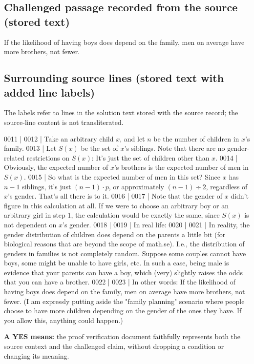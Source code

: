 \documentclass[11pt]{article}
\begin{document}
\subsection*{Challenged passage recorded from the source (stored text)}
\begin{Vsrc}
If the likelihood of having boys does depend on the family, men on average have more brothers, not fewer.
\end{Vsrc}
\subsection*{Surrounding source lines (stored text with added line labels)}
The labels refer to lines in the solution text stored with the source record; the source-line content is not transliterated.
\begin{Vsrc}
0011 | 
0012 | Take an arbitrary child $x$, and let $n$ be the number of children in $x$'s family. 
0013 | Let $S(x)$ be the set of $x$'s siblings. Note that there are no gender-related restrictions on $S(x)$: It's just the set of children other than $x$.
0014 | Obviously, the expected number of $x$'s brothers is the expected number of men in $S(x)$. 
0015 | So what is the expected number of men in this set? Since $x$ has $n-1$ siblings, it's just $(n-1)\cdot p$, or approximately $(n-1)\div 2$, regardless of $x$'s gender. That's all there is to it.
0016 | 
0017 | Note that the gender of $x$ didn't figure in this calculation at all. If we were to choose an arbitrary boy or an arbitrary girl in step 1, the calculation would be exactly the same, since $S(x)$ is not dependent on $x$'s gender.
0018 | 
0019 | In real life: 
0020 | 
0021 | In reality, the gender distribution of children does depend on the parents a little bit (for biological reasons that are beyond the scope of math.se). I.e., the distribution of genders in families is not completely random. Suppose some couples cannot have boys, some might be unable to have girls, etc. In such a case, being male is evidence that your parents can have a boy, which (very) slightly raises the odds that you can have a brother. 
0022 | 
0023 | In other words: If the likelihood of having boys does depend on the family, men on average have more brothers, not fewer. (I am expressly putting aside the "family planning" scenario where people choose to have more children depending on the gender of the ones they have. If you allow this, anything could happen.)
\end{Vsrc}
\textbf{A YES means:} the proof verification document faithfully represents both the source context and the challenged claim, without dropping a condition or changing its meaning.
\end{document}
